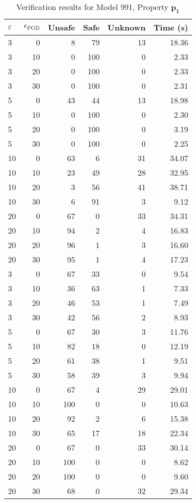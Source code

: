 \begin{table}[htbp]
\centering
\caption{Verification results for Model 991, Property $\mathbf{p_{1}}$}
\label{tab:model991_r1_part3}
\begin{tabular}{lrrrrr}
\toprule
$\varepsilon$ & $\epsilon_{\scriptscriptstyle\mathrm{PGD}}$ & Unsafe & Safe & Unknown & Time (s) \\
\midrule
3 & 0 & 8 & 79 & 13 & 18.36 \\
3 & 10 & 0 & 100 & 0 & 2.33 \\
3 & 20 & 0 & 100 & 0 & 2.33 \\
3 & 30 & 0 & 100 & 0 & 2.31 \\
5 & 0 & 43 & 44 & 13 & 18.98 \\
5 & 10 & 0 & 100 & 0 & 2.30 \\
5 & 20 & 0 & 100 & 0 & 3.19 \\
5 & 30 & 0 & 100 & 0 & 2.25 \\
10 & 0 & 63 & 6 & 31 & 34.07 \\
10 & 10 & 23 & 49 & 28 & 32.95 \\
10 & 20 & 3 & 56 & 41 & 38.71 \\
10 & 30 & 6 & 91 & 3 & 9.12 \\
20 & 0 & 67 & 0 & 33 & 34.31 \\
20 & 10 & 94 & 2 & 4 & 16.83 \\
20 & 20 & 96 & 1 & 3 & 16.60 \\
20 & 30 & 95 & 1 & 4 & 17.23 \\
3 & 0 & 67 & 33 & 0 & 9.54 \\
3 & 10 & 36 & 63 & 1 & 7.33 \\
3 & 20 & 46 & 53 & 1 & 7.49 \\
3 & 30 & 42 & 56 & 2 & 8.93 \\
5 & 0 & 67 & 30 & 3 & 11.76 \\
5 & 10 & 82 & 18 & 0 & 12.19 \\
5 & 20 & 61 & 38 & 1 & 9.51 \\
5 & 30 & 58 & 39 & 3 & 9.94 \\
10 & 0 & 67 & 4 & 29 & 29.01 \\
10 & 10 & 100 & 0 & 0 & 10.63 \\
10 & 20 & 92 & 2 & 6 & 15.38 \\
10 & 30 & 65 & 17 & 18 & 22.34 \\
20 & 0 & 67 & 0 & 33 & 30.14 \\
20 & 10 & 100 & 0 & 0 & 8.62 \\
20 & 20 & 100 & 0 & 0 & 9.60 \\
20 & 30 & 68 & 0 & 32 & 29.34 \\
\bottomrule
\end{tabular}
\end{table}
